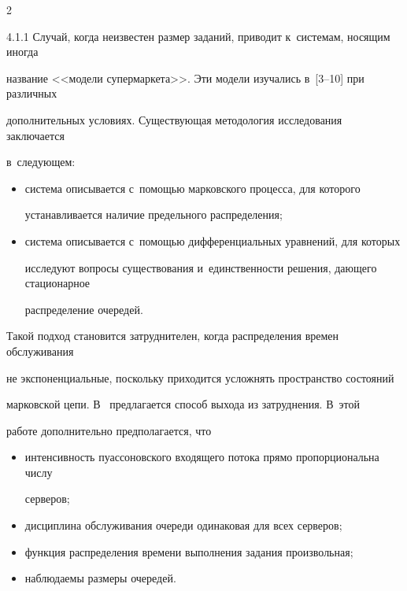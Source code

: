 \begin{multicols}{2}
    


    4.1.1 Случай, когда неизвестен размер заданий, приводит к~системам, носящим иногда 


название <<модели супермаркета>>. Эти модели изучались в~[3--10] при различных 


дополнительных условиях. Существующая методология исследования заключается 


в~следующем:


    \begin{itemize}


    \item  система описывается с~помощью марковского процесса, для которого 


устанавливается наличие предельного распределения;


    \item система описывается с~помощью дифференциальных уравнений, для которых 


исследуют вопросы существования и~единственности решения, дающего стационарное 


распределение очередей.


    \end{itemize}


    


    Такой подход становится затруднителен, когда распределения времен обслуживания 


не экспоненциальные, поскольку приходится усложнять пространство состояний 


марковской цепи. В~\cite{10-kon} предлагается способ выхода из затруднения. В~этой 


работе дополнительно предполагается, что


    \begin{itemize}


    \item интенсивность пуассоновского входящего потока прямо пропорциональна числу 


серверов;


    \item дисциплина обслуживания очереди одинаковая для всех серверов;


    \item функция распределения времени выполнения задания произвольная;


    \item наблюдаемы размеры очередей.


    \end{itemize}



\end{multicols}
